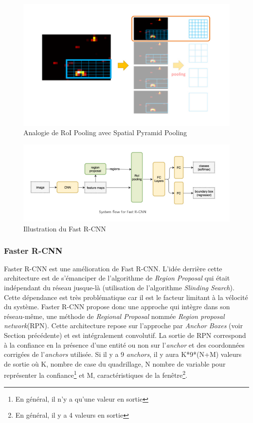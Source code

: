 \begin{figure}
    \centering
    \includegraphics[scale=0.4]{./tex/computer-vision/sota/fast1.png}
    \caption{Analogie de RoI Pooling avec Spatial Pyramid Pooling}
    \label{fast1}
\end{figure}

\begin{figure}
    \centering
    \includegraphics[scale=0.4]{./tex/computer-vision/sota/fastrcnn.png}
    \caption{Illustration du Fast R-CNN}
    \label{fast2}
\end{figure}

\subsubsection{Faster R-CNN}
\label{fastrcnnsec}
Faster R-CNN\cite{fastercnn_deep} est une amélioration de Fast R-CNN. L'idée derrière cette architecture est de s'émanciper de l'algorithme de \textit{Region Proposal} qui était indépendant du réseau jusque-là (utilisation de l'algorithme \textit{Slinding Search}). Cette dépendance est très problématique car il est le facteur limitant à la vélocité du système. Faster R-CNN propose donc une approche qui intègre dans son réseau-même, une méthode de \textit{Regional Proposal} nommée \textit{Region proposal network}(RPN). Cette architecture repose sur l'approche par \textit{Anchor Boxes} (voir Section précédente) et est intégralement convolutif. La sortie de RPN correspond à la confiance en la présence d'une entité ou non sur l'\textit{anchor} et des coordonnées corrigées de l'\textit{anchors} utilisée. Si il y a 9 \textit{anchors}, il y aura K*9*(N+M) valeurs de sortie où K, nombre de case du quadrillage, N nombre de variable pour représenter la confiance\footnote{En général, il n'y a qu'une valeur en sortie} et M, caractéristiques de la fenêtre\footnote{En général, il y a 4 valeurs en sortie}.\\

